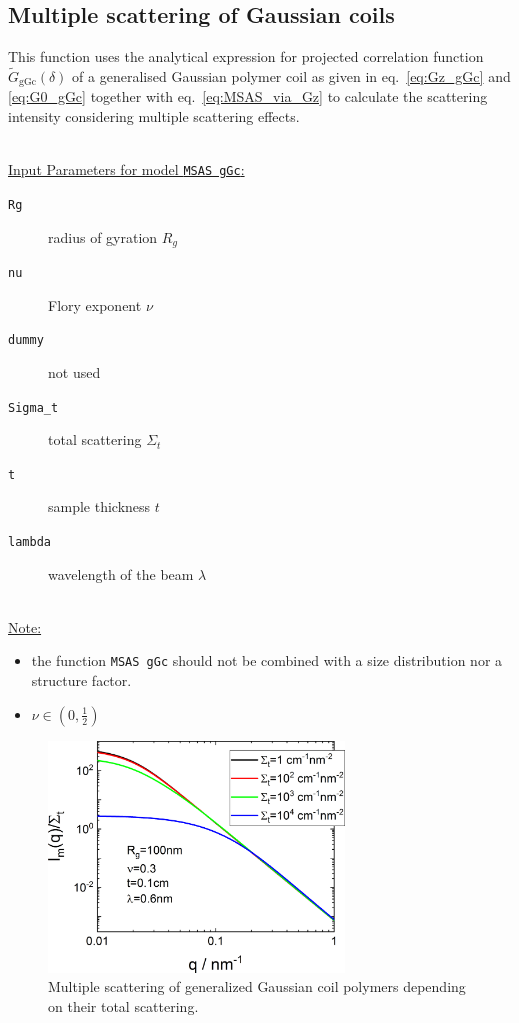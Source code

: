 \newpage
\subsection{Multiple scattering of Gaussian coils}

This function uses the analytical expression for projected correlation function $\tilde{G}_\mathrm{gGc}(\delta)$ of a generalised Gaussian polymer coil as given in eq.\ \ref{eq:Gz_gGc} and \ref{eq:G0_gGc} together with eq.\ \ref{eq:MSAS_via_Gz} to calculate the scattering intensity considering multiple scattering effects.

\hspace{1pt}\\
\underline{Input Parameters for model \texttt{MSAS gGc}:}\\
\begin{description}
\item[\texttt{Rg}] radius of gyration $R_g$
\item[\texttt{nu}] Flory exponent $\nu$
\item[\texttt{dummy}] not used
\item[\texttt{Sigma\_t}] total scattering $\Sigma_t$
\item[\texttt{t}] sample thickness $t$
\item[\texttt{lambda}] wavelength of the beam $\lambda$
\end{description}

\hspace{1pt}\\
\underline{Note:}
\begin{itemize}
\item the function \texttt{MSAS gGc} should not be combined with a size distribution nor a structure factor.
\item $\nu \in \left(0,\frac12\right)$
\end{itemize}

\begin{figure}[htb]
\begin{center}
\includegraphics[width=0.7\textwidth]{../images/form_factor/MSAS/MSAS_gGc.png}
\end{center}
\caption{Multiple scattering of generalized Gaussian coil polymers depending on their total scattering.}
\label{fig:MSAS_gGc}
\end{figure}

